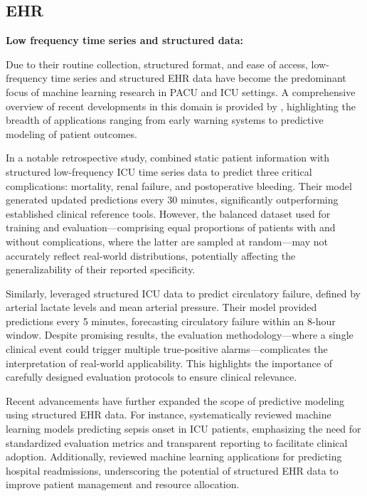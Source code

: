 \subsection{EHR}
\vspace{1ex}
\noindent
\textbf{Low frequency time series and structured data:}

Due to their routine collection, structured format, and ease of access, low-frequency time series and structured EHR data have become the predominant focus of machine learning research in PACU and ICU settings. A comprehensive overview of recent developments in this domain is provided by \citet{gutierrez2020artificial}, highlighting the breadth of applications ranging from early warning systems to predictive modeling of patient outcomes.\highLight[yellow]

In a notable retrospective study, \citet{meyer2018machine} combined static patient information with structured low-frequency ICU time series data to predict three critical complications: mortality, renal failure, and postoperative bleeding. Their model generated updated predictions every 30 minutes, significantly outperforming established clinical reference tools. However, the balanced dataset used for training and evaluation—comprising equal proportions of patients with and without complications, where the latter are sampled at random—may not accurately reflect real-world distributions, potentially affecting the generalizability of their reported specificity.

Similarly, \citet{hyland2020early} leveraged structured ICU data to predict circulatory failure, defined by arterial lactate levels and mean arterial pressure. Their model provided predictions every 5 minutes, forecasting circulatory failure within an 8-hour window. Despite promising results, the evaluation methodology—where a single clinical event could trigger multiple true-positive alarms—complicates the interpretation of real-world applicability. This highlights the importance of carefully designed evaluation protocols to ensure clinical relevance.

Recent advancements have further expanded the scope of predictive modeling using structured EHR data. For instance, \citet{yang2023predicting} systematically reviewed machine learning models predicting sepsis onset in ICU patients, emphasizing the need for standardized evaluation metrics and transparent reporting to facilitate clinical adoption. Additionally, \citet{huang2021application} reviewed machine learning applications for predicting hospital readmissions, underscoring the potential of structured EHR data to improve patient management and resource allocation.

